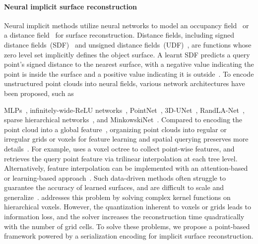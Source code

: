 \paragraph{Neural implicit surface reconstruction}
Neural implicit methods utilize neural networks to model an occupancy field~\cite{mescheder2019occupancy, ouasfi2024unsupervised} or a distance field~\cite{park2019deepsdf, huang2022neural} for surface reconstruction.
Distance fields, including signed distance fields~(SDF)~\cite{park2019deepsdf,koneputugodage2024small,BaoruiTowards} and unsigned distance fields~(UDF)~\cite{chibane2020ndf,wang2022rangeudf}, are functions whose zero level set implicitly defines the object surface.
A learnt SDF predicts a query point's signed distance to the nearest surface, with a negative value indicating the point is inside the surface and a positive value indicating it is outside~\cite{takikawa2021neural}.
\quad
To encode unstructured point clouds into neural fields, various network architectures have been proposed, such as  

MLPs~\cite{Chen_2019_CVPR,mescheder2019occupancy,park2019deepsdf}, infinitely-wide-ReLU networks~\cite{williams2021neural}, PointNet~\cite{williams2022neural,tang2021SACon}, 3D-UNet~\cite{wang2023alto}, RandLA-Net~\cite{wang2022rangeudf}, sparse hierarchical networks~\cite{huang2023neural}, and MinkowskiNet~\cite{neuraludf}.
Compared to encoding the point cloud into a global feature~\cite{park2019deepsdf,Points2Surf}, organizing point clouds into regular or irregular grids or voxels for feature learning and spatial querying preserves more details~\cite{li2022learning,zhang20223dilg,zhong20243d,peng2020convoccnet,williams2022neural,li2024gridformer}.
For example, \cite{takikawa2021neural} uses a voxel octree to collect point-wise features, and retrieves the query point feature via trilinear interpolation at each tree level.
Alternatively, feature interpolation can be implemented with an attention-based~\cite{wang2023alto} or learning-based approach~\cite{boulch2022poco}.
Such data-driven methods often struggle to guarantee the accuracy of learned surfaces, and are difficult to scale and generalize~\cite{huang2022neural,williams2022neural}.
\citet{huang2023neural} addresses this problem by solving complex kernel functions on hierarchical voxels.
However, the quantization inherent to voxels or grids leads to information loss, and the solver increases the reconstruction time quadratically with the number of grid cells.
To solve these problems, we propose a point-based framework powered by a serialization encoding for implicit surface reconstruction.

